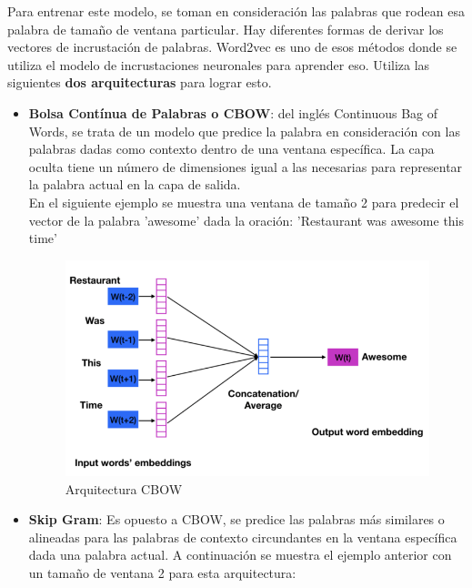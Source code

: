 \documentclass[a4paper,12pt]{report}
\begin{document}
Para entrenar este modelo, se toman en consideración las palabras que rodean esa palabra de tamaño de ventana particular. Hay diferentes formas de derivar los vectores de incrustación de palabras. Word2vec es uno de esos métodos donde se utiliza el modelo de incrustaciones neuronales para aprender eso. Utiliza las siguientes \textbf{dos arquitecturas} para lograr esto.

\begin{itemize}

\item \textbf{Bolsa Contínua de Palabras o CBOW}: del inglés Continuous Bag of Words, se trata de un modelo que predice la palabra en consideración con las palabras dadas como contexto dentro de una ventana específica. La capa oculta tiene un número de dimensiones igual a las necesarias para representar la palabra actual en la capa de salida. 
\vspace{2mm}\\
En el siguiente ejemplo se muestra una ventana de tamaño 2 para predecir el vector de la palabra 'awesome' dada la oración: 'Restaurant was awesome this time’


\vspace{4mm}
\begin{figure}[htbp!]
\centering
\includegraphics[scale=0.4]{images/cbow.png}
\caption{Arquitectura CBOW}
\end{figure}
\vspace{2mm}


\item \textbf{Skip Gram}: Es opuesto a CBOW, se predice las palabras más similares o alineadas para las palabras de contexto circundantes en la ventana específica dada una palabra actual.
A continuación se muestra el ejemplo anterior con un tamaño de ventana 2 para esta arquitectura:


\end{itemize}
\end{document}
